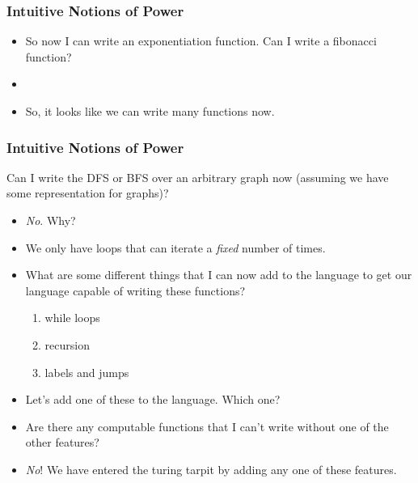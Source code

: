 \documentclass{beamer}
\begin{document}


\begin{frame}
  \frametitle{Intuitive Notions of Power}
  \twoN
  \begin{itemize}
  \item<2-> So now I can write an exponentiation function. Can I write a fibonacci function?
  \item<3-> \fib
  \item<4-> So, it looks like we can write many functions now.
  \end{itemize}
\end{frame}

\begin{frame}
  \frametitle{Intuitive Notions of Power}
  Can I write the DFS or BFS over an arbitrary graph now (assuming we have some representation for graphs)?
  \begin{itemize}
  \item<2-> \emph{No}. Why?
  \item<3-> We only have loops that can iterate a \emph{fixed} number of times.
  \item<4-> What are some different things that I can now add to the language to get our language
    capable of writing these functions?
    \begin{enumerate}
    \item<2-> while loops
    \item<3-> recursion
    \item<4-> labels and jumps
    \end{enumerate}
  \item<5-> Let's add one of these to the language. Which one?
  \item<6-> Are there any computable functions that I can't write without one of the other features?
  \item<7-> \emph{No}! We have entered the turing tarpit by adding any one of these features. 
  \end{itemize}  
\end{frame}
\end{document}
